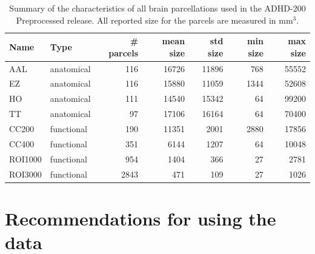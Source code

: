 \documentclass[preprint,12pt,3p]{elsarticle}
\begin{document}
\begin{table}[htbp]
\label{tab_parcellations}
\caption{Summary of the characteristics of all brain parcellations used in the ADHD-200 Preprocessed release. All reported size for the parcels are measured in mm$^3$.}
\begin{tabular}{llrrrrr}
Name & Type & \# parcels & mean size & std size & min size & max size \\
\hline
AAL	    & anatomical &  116 &  16726 & 11896 &  768 & 55552\\
EZ	    & anatomical &  116 &  15880 & 11059 & 1344 & 52608\\
HO	    & anatomical &  111 &  14540 & 15342 &   64 & 99200\\
TT	    & anatomical & 	 97 &  17106 & 16164 &   64 & 70400\\
CC200   & functional &  190 &  11351 &  2001 & 2880 & 17856\\
CC400   & functional &  351 &   6144 &  1207 &   64 & 10048\\
ROI1000 & functional &  954 &   1404 &   366 &   27 & 2781\\
ROI3000	& functional & 2843	&    471 &   109 &   27 & 1026\\
\end{tabular}
\end{table}

%

\section{Recommendations for using the data}
\end{document}
